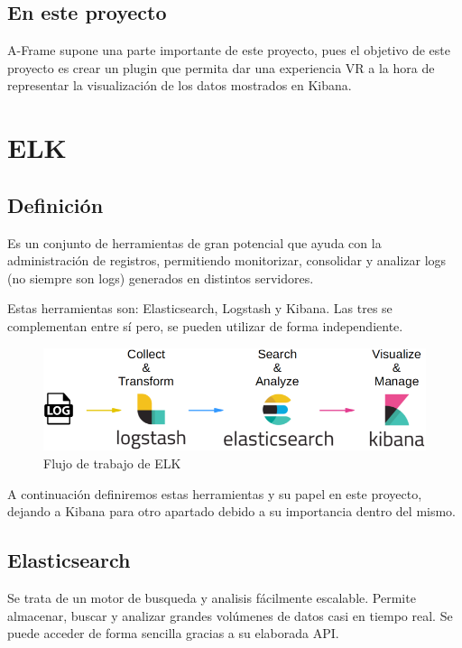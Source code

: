 \documentclass[a4paper, 12pt]{book}
\begin{document}
\subsection{En este proyecto}
A-Frame supone una parte importante de este proyecto, pues el objetivo de este proyecto es crear un plugin que permita dar una experiencia VR a la hora de representar la visualización de los datos mostrados en Kibana. 



\section{ELK}
\label{sec:elastic}
\subsection{Definición}
Es un conjunto de herramientas de gran potencial que ayuda con la administración de registros, permitiendo monitorizar, consolidar y analizar logs (no siempre son logs) generados en distintos servidores.
 
Estas herramientas son: Elasticsearch, Logstash y Kibana. Las tres se complementan entre sí pero, se pueden utilizar de forma independiente.

\begin{figure}[H]
  \centering
  \includegraphics[width=12cm, keepaspectratio]{img/development/elk.png}
  \caption{Flujo de trabajo de ELK}
  \label{fig:diagramaelk}
\end{figure}

A continuación definiremos estas herramientas y su papel en este proyecto, dejando a Kibana para otro apartado debido a su importancia dentro del mismo.

\subsection{Elasticsearch}
Se trata de un motor de busqueda y analisis fácilmente escalable. Permite almacenar, buscar y analizar grandes volúmenes de datos casi en tiempo real. Se puede acceder de forma sencilla gracias a su elaborada API\cite{srivastava:_elasticguide}.
\end{document}

